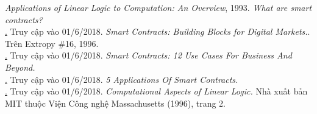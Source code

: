 \documentclass[a4paper]{article}
\begin{document}
\newpage
{}
\begin{thebibliography}{99999}
 {\em Applications of Linear Logic to Computation: An Overview}, 1993.
 {\em What are smart contracts?}\\
\hyperlink{https://www.cryptoninjas.net/what-are-smart-contracts/}. Truy cập vào 01/6/2018.
 {\em Smart Contracts: Building Blocks for Digital Markets.}. Trên Extropy \#16, 1996.
\\ \hyperlink{https://blockgeeks.com/guides/smart-contracts/}. Truy cập vào 01/6/2018.
 {\em Smart Contracts: 12 Use Cases For Business And Beyond.}\\
\hyperlink{https://www.ccn.com/smart-contracts-12-use-cases-for-business-and-beyond/}. Truy cập vào 01/6/2018.
 {\em 5 Applications Of Smart Contracts.}\\
\hyperlink{https://disruptionhub.com/smart-contract-uses/}. Truy cập vào 01/6/2018.
 {\em Computational Aspects of Linear Logic.} Nhà xuất bản MIT thuộc Viện Công nghệ Massachusetts (1996), trang 2.

\end{thebibliography}
\end{document}
